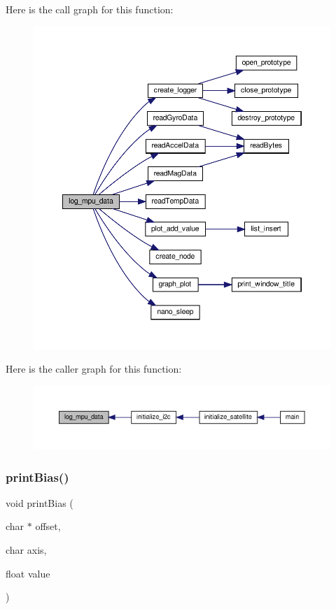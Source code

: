 Here is the call graph for this function\+:
\nopagebreak
\begin{figure}[H]
\begin{center}
\leavevmode
\includegraphics[width=350pt]{i2c-interface_8c_a0ffd56a84248b3976097e0d38b2fcdaf_cgraph}
\end{center}
\end{figure}
Here is the caller graph for this function\+:
\nopagebreak
\begin{figure}[H]
\begin{center}
\leavevmode
\includegraphics[width=350pt]{i2c-interface_8c_a0ffd56a84248b3976097e0d38b2fcdaf_icgraph}
\end{center}
\end{figure}
\mbox{\label{i2c-interface_8c_a14f7a41ccc0cdae430b5c7086a34e9c0}} 
\subsubsection{\texorpdfstring{print\+Bias()}{printBias()}}
{\footnotesize\ttfamily void print\+Bias (\begin{DoxyParamCaption}\item[{char $\ast$}]{offset,  }\item[{char}]{axis,  }\item[{float}]{value }\end{DoxyParamCaption})}


